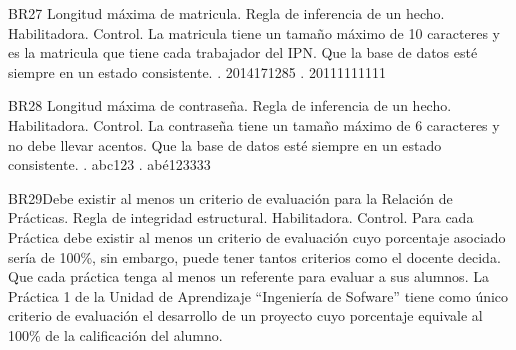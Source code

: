\begin{BussinesRule}{BR27}{ Longitud máxima de matricula.}
    \BRitem[Tipo: ]Regla de inferencia de un hecho.
    \BRitem[Clase: ]Habilitadora.
    \BRitem[Nivel: ]Control.
    \BRitem[Descripción: ]La matricula tiene un tamaño máximo de 10 caracteres y es la matricula que tiene cada trabajador del IPN.
    \BRitem[Sentencia:]
    \BRitem[Motivación: ]Que la base de datos esté siempre en un estado consistente.
     . 2014171285
    . 20111111111
\end{BussinesRule}
\begin{BussinesRule}{BR28}{ Longitud máxima de contraseña.}
    \BRitem[Tipo: ]Regla de inferencia de un hecho.
    \BRitem[Clase: ]Habilitadora.
    \BRitem[Nivel: ]Control.
    \BRitem[Descripción: ]La contraseña tiene un tamaño máximo de 6 caracteres y no debe llevar acentos.
    \BRitem[Sentencia:]
    \BRitem[Motivación: ]Que la base de datos esté siempre en un estado consistente.
     . abc123
    . abé123333
\end{BussinesRule}
\begin{BussinesRule}{BR29}{Debe existir al menos un criterio de evaluación para la Relación de Prácticas.}
    \BRitem[Tipo:] Regla de integridad estructural.
    \BRitem[Clase:] Habilitadora.
    \BRitem[Nivel:] Control.
    \BRitem[Descripción:] Para cada Práctica debe existir al menos un criterio de evaluación cuyo porcentaje asociado sería de 100\%, sin embargo, puede tener tantos criterios como el docente decida.
    \BRitem[Motivación:] Que cada práctica tenga al menos un referente para evaluar a sus alumnos.
     La Práctica 1 de la Unidad de Aprendizaje ``Ingeniería de Sofware'' tiene como único criterio de evaluación el desarrollo de un proyecto cuyo porcentaje equivale al 100\% de la calificación del alumno.
\end{BussinesRule}
